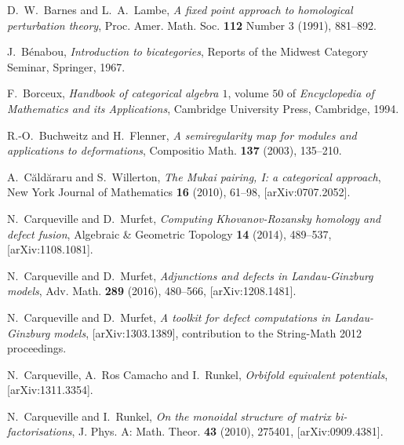\documentclass[english,letter paper,12pt,leqno]{article}
\theoremstyle{example}
\numberwithin{equation}{section}
\begin{document}

\providecommand{\bysame}{\leavevmode\hbox to3em{\hrulefill}\thinspace}
\providecommand{\href}[2]{#2}
\begin{thebibliography}{BHLS03}


D.~W.~Barnes and L.~A.~Lambe, \emph{A fixed point approach to homological perturbation theory}, Proc. Amer.
  Math. Soc. \textbf{112} Number 3 (1991), 881--892.

J.~B\'{e}nabou, \textsl{Introduction to bicategories}, Reports of the Midwest Category Seminar, Springer, 1967.

F.~Borceux, \textsl{Handbook of categorical algebra $1$}, volume $50$ of \textsl{Encyclopedia of Mathematics and its Applications}, Cambridge University Press, Cambridge, 1994.

R.-O.~Buchweitz and H.~Flenner, \textsl{A semiregularity map for modules and applications to deformations}, Compositio Math. \textbf{137} (2003), 135--210.
    
A.~{C\u ald\u araru} and S.~Willerton, \textsl{The Mukai pairing, I: a categorical approach},
New York Journal of Mathematics \textbf{16} (2010), 61--98, 
  \href{http://arxiv.org/abs/0707.2052}{[arXiv:0707.2052]}.

N.~Carqueville and D.~Murfet, \textsl{Computing {K}hovanov-{R}ozansky homology and defect fusion}, Algebraic \& Geometric Topology \textbf{14} (2014), 489--537, \href{http://arxiv.org/abs/1108.1081}{[arXiv:1108.1081]}. 

N.~Carqueville and D.~Murfet, \textsl{Adjunctions and defects in {L}andau-{G}inzburg models}, Adv. Math. \textbf{289} (2016), 480--566, \href{http://arxiv.org/abs/1208.1481}{[arXiv:1208.1481]}.

N.~Carqueville and D.~Murfet, \textsl{A toolkit for defect computations in Landau-Ginzburg models}, \href{http://arxiv.org/abs/1303.1389}{[arXiv:1303.1389]}, contribution to the String-Math 2012 proceedings.

N.~Carqueville, A.~Ros Camacho and I.~Runkel, \textsl{Orbifold equivalent potentials}, \href{http://arxiv.org/abs/1311.3354}{[arXiv:1311.3354]}.

N.~Carqueville and I.~Runkel, \textsl{On the monoidal structure of matrix bi-factorisations}, J. Phys.
  A: Math. Theor. \textbf{43} (2010), 275401,
  \href{http://arxiv.org/abs/0909.4381}{[arXiv:0909.4381]}.
  

\end{thebibliography}
\end{document}

